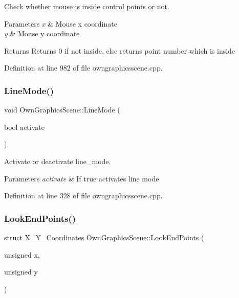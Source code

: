 Check whether mouse is inside control points or not. 


\begin{DoxyParams}{Parameters}
{\em x} & Mouse x coordinate \\
\hline
{\em y} & Mouse y coordinate \\
\hline
\end{DoxyParams}
\begin{DoxyReturn}{Returns}
Returns 0 if not inside, else returns point number which is inside 
\end{DoxyReturn}


Definition at line 982 of file owngraphicsscene.\+cpp.

\mbox{\label{classOwnGraphicsScene_a6b7e69131827f0ae64626af378ff9974}} 
\subsubsection{\texorpdfstring{Line\+Mode()}{LineMode()}}
{\footnotesize\ttfamily void Own\+Graphics\+Scene\+::\+Line\+Mode (\begin{DoxyParamCaption}\item[{bool}]{activate }\end{DoxyParamCaption})}



Activate or deactivate line\+\_\+mode. 


\begin{DoxyParams}{Parameters}
{\em activate} & If true activates line mode \\
\hline
\end{DoxyParams}


Definition at line 328 of file owngraphicsscene.\+cpp.

\mbox{\label{classOwnGraphicsScene_a17930b28f2c5cb7ed14440e44d667951}} 
\subsubsection{\texorpdfstring{Look\+End\+Points()}{LookEndPoints()}}
{\footnotesize\ttfamily struct \mbox{\hyperlink{structX__Y__Coordinates}{X\+\_\+\+Y\+\_\+\+Coordinates}} Own\+Graphics\+Scene\+::\+Look\+End\+Points (\begin{DoxyParamCaption}\item[{unsigned}]{x,  }\item[{unsigned}]{y }\end{DoxyParamCaption})}



